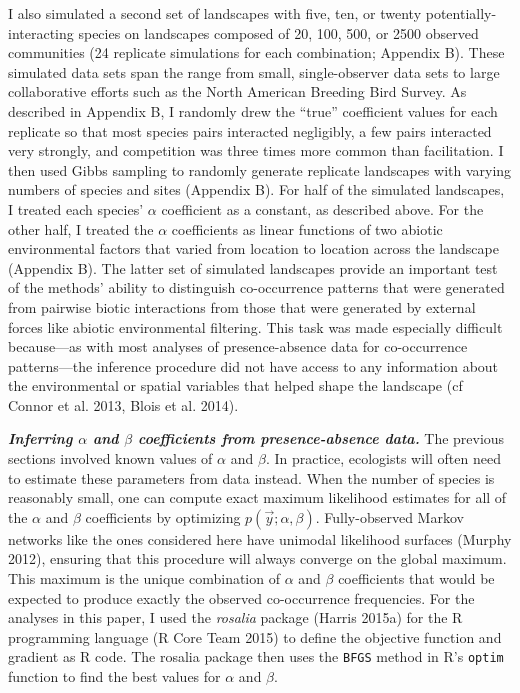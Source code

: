 \documentclass[12pt,]{article}
\begin{document}
\begin{spacing}{1.9}
\begin{flushleft}
I also simulated a second set of landscapes with five, ten, or twenty
potentially-interacting species on landscapes composed of 20, 100, 500,
or 2500 observed communities (24 replicate simulations for each
combination; Appendix B). These simulated data sets span the range from
small, single-observer data sets to large collaborative efforts such as
the North American Breeding Bird Survey. As described in Appendix B, I
randomly drew the ``true'' coefficient values for each replicate so that
most species pairs interacted negligibly, a few pairs interacted very
strongly, and competition was three times more common than facilitation.
I then used Gibbs sampling to randomly generate replicate landscapes
with varying numbers of species and sites (Appendix B). For half of the
simulated landscapes, I treated each species' \(\alpha\) coefficient as
a constant, as described above. For the other half, I treated the
\(\alpha\) coefficients as linear functions of two abiotic environmental
factors that varied from location to location across the landscape
(Appendix B). The latter set of simulated landscapes provide an
important test of the methods' ability to distinguish co-occurrence
patterns that were generated from pairwise biotic interactions from
those that were generated by external forces like abiotic environmental
filtering. This task was made especially difficult because---as with
most analyses of presence-absence data for co-occurrence patterns---the
inference procedure did not have access to any information about the
environmental or spatial variables that helped shape the landscape (cf
Connor et al. 2013, Blois et al. 2014).

\textbf{\emph{Inferring \(\alpha\) and \(\beta\) coefficients from
presence-absence data.}} The previous sections involved known values of
\(\alpha\) and \(\beta\). In practice, ecologists will often need to
estimate these parameters from data instead. When the number of species
is reasonably small, one can compute exact maximum likelihood estimates
for all of the \(\alpha\) and \(\beta\) coefficients by optimizing
\(p(\vec{y}; \alpha, \beta)\). Fully-observed Markov networks like the
ones considered here have unimodal likelihood surfaces (Murphy 2012),
ensuring that this procedure will always converge on the global maximum.
This maximum is the unique combination of \(\alpha\) and \(\beta\)
coefficients that would be expected to produce exactly the observed
co-occurrence frequencies. For the analyses in this paper, I used the
\emph{rosalia} package (Harris 2015a) for the R programming language (R
Core Team 2015) to define the objective function and gradient as R code.
The rosalia package then uses the \texttt{BFGS} method in R's
\texttt{optim} function to find the best values for \(\alpha\) and
\(\beta\).


\end{flushleft}
\end{spacing}
\end{document}
